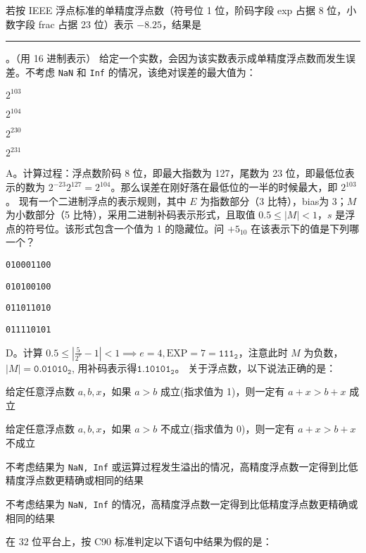 \begin{problems}
         若按 IEEE 浮点标准的单精度浮点数（符号位 1 位，阶码字段 exp 占据 8 位，小数字段 frac 占据 23 位）表示 $-8.25$，结果是 \rule{2.5cm}{0.25mm}。（用 16 进制表示）
         给定一个实数，会因为该实数表示成单精度浮点数而发生误差。不考虑 \texttt{NaN} 和 \texttt{Inf} 的情况，该绝对误差的最大值为：
        \begin{choices}
            \item $2^{103}$
            \item $2^{104}$
            \item $2^{230}$
            \item $2^{231}$
        \end{choices}
        \sol A。计算过程：浮点数阶码 8 位，即最大指数为 127，尾数为 23 位，即最低位表示的数为 $2^{-23}2^{127}=2^{104}$。那么误差在刚好落在最低位的一半的时候最大，即 $2^{103}$。
         现有一个二进制浮点的表示规则，其中 $E$ 为指数部分（3 比特），bias为 3；$M$ 为小数部分（5 比特），采用二进制补码表示形式，且取值 $0.5 \leq |M|<1$，$s$ 是浮点的符号位。该形式包含一个值为 1 的隐藏位。问 $+5_{10}$ 在该表示下的值是下列哪一个？
        \begin{choices}
            \item \texttt{010001100}
            \item \texttt{010100100}
            \item \texttt{011011010}
            \item \texttt{011110101}
        \end{choices}
        \sol D。计算 $0.5 \leq \left|\frac{5}{2^e}-1 \right|<1 \implies e=4, \text{EXP}=7 = \texttt{111}_\texttt{2}$，注意此时 $M$ 为负数，$|M|=\texttt{0.01010}_\texttt{2}$, 用补码表示得$\texttt{1.10101}_\texttt{2}$。
         关于浮点数，以下说法正确的是：
        \begin{choices}
            \item 给定任意浮点数 $a, b, x$，如果 $a>b$ 成立(指求值为 1)，则一定有 $a+x>b+x$ 成立
            \item 给定任意浮点数 $a, b, x$，如果 $a>b$ 不成立(指求值为 0)，则一定有 $a+x>b+x$ 不成立
            \item 不考虑结果为 \texttt{NaN, Inf} 或运算过程发生溢出的情况，高精度浮点数一定得到比低精度浮点数更精确或相同的结果
            \item 不考虑结果为 \texttt{NaN, Inf} 的情况，高精度浮点数一定得到比低精度浮点数更精确或相同的结果
        \end{choices}
         在 32 位平台上，按 C90 标准判定以下语句中结果为假的是：

\end{problems}
